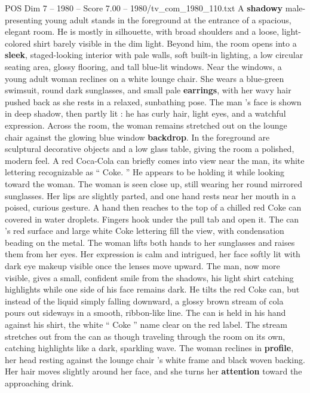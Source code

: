 \begin{textsample}{POS Dim 7 – 1980 – Score 7.00 – 1980/tv\_com\_1980\_110.txt}  \label{ex:f7_pos_044}
A \textbf{shadowy} male-presenting young adult stands in the foreground at the entrance of a spacious, elegant room.
He is mostly in silhouette, with broad shoulders and a loose, light-colored shirt barely visible in the dim light.
Beyond him, the room opens into a \textbf{sleek}, staged-looking interior with pale walls, soft built-in lighting, a low circular seating area, glossy flooring, and tall blue-lit windows.
Near the windows, a young adult woman reclines on a white lounge chair.
She wears a blue-green swimsuit, round dark sunglasses, and small pale \textbf{earrings}, with her wavy hair pushed back as she rests in a relaxed, sunbathing pose.
The man ’s face is shown in deep shadow, then partly lit : he has curly hair, light eyes, and a watchful expression.
Across the room, the woman remains stretched out on the lounge chair against the glowing blue window \textbf{backdrop}.
In the foreground are sculptural decorative objects and a low glass table, giving the room a polished, modern feel.
A red Coca-Cola can briefly comes into view near the man, its white lettering recognizable as “ Coke. ” He appears to be holding it while looking toward the woman.
The woman is seen close up, still wearing her round mirrored sunglasses.
Her lips are slightly parted, and one hand rests near her mouth in a poised, curious gesture.
A hand then reaches to the top of a chilled red Coke can covered in water droplets.
Fingers hook under the pull tab and open it.
The can ’s red surface and large white Coke lettering fill the view, with condensation beading on the metal.
The woman lifts both hands to her sunglasses and raises them from her eyes.
Her expression is calm and intrigued, her face softly lit with dark eye makeup visible once the lenses move upward.
The man, now more visible, gives a small, confident smile from the shadows, his light shirt catching highlights while one side of his face remains dark.
He tilts the red Coke can, but instead of the liquid simply falling downward, a glossy brown stream of cola pours out sideways in a smooth, ribbon-like line.
The can is held in his hand against his shirt, the white “ Coke ” name clear on the red label.
The stream stretches out from the can as though traveling through the room on its own, catching highlights like a dark, sparkling wave.
The woman reclines in \textbf{profile}, her head resting against the lounge chair ’s white frame and black woven backing.
Her hair moves slightly around her face, and she turns her \textbf{attention} toward the approaching drink.

\end{textsample}
